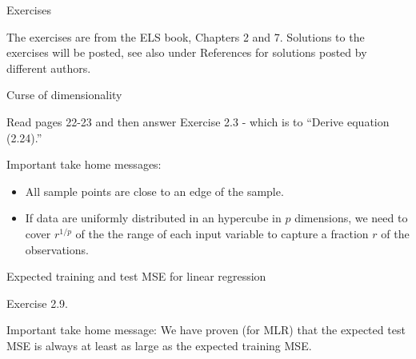 \documentclass[
  ignorenonframetext,
]{beamer}
\providecommand{\tightlist}{%
  \setlength{\itemsep}{0pt}\setlength{\parskip}{0pt}}
\begin{document}
\begin{frame}{Exercises}
\protect\hypertarget{exercises}{}

The exercises are from the ELS book, Chapters 2 and 7. Solutions to the
exercises will be posted, see also under References for solutions posted
by different authors.

\begin{block}{Curse of dimensionality}

Read pages 22-23 and then answer Exercise 2.3 - which is to ``Derive
equation (2.24).''

Important take home messages:

\begin{itemize}
\tightlist
\item
  All sample points are close to an edge of the sample.
\item
  If data are uniformly distributed in an hypercube in \(p\) dimensions,
  we need to cover \(r^{1/p}\) of the the range of each input variable
  to capture a fraction \(r\) of the observations.
\end{itemize}

\end{block}

\begin{block}{Expected training and test MSE for linear regression}

Exercise 2.9.

Important take home message: We have proven (for MLR) that the expected
test MSE is always at least as large as the expected training MSE.

\end{block}

\end{frame}
\end{document}
